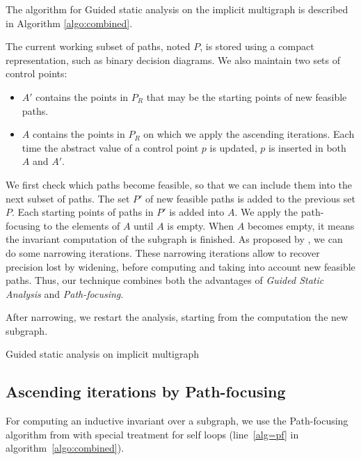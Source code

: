\documentclass[preprint]{sigplanconf}
\begin{document}
The algorithm for Guided static analysis on the implicit multigraph is described
in Algorithm \ref{algo:combined}.

The current working subset of paths, noted $P$, is stored using a
compact representation, such as binary decision diagrams.
We also maintain two sets of control points:
\begin{itemize}
	\item $A'$ contains the points in $P_R$ that may be the starting points of new
		feasible paths.
	\item $A$ contains the points in $P_R$ on which we apply the ascending iterations.
	Each time the abstract value of a control point $p$ is updated, $p$ is
	inserted in both $A$ and $A'$.
\end{itemize}

We first check which paths become feasible, so that we can include them into the
next subset of paths. The set $P'$ of new feasible paths is added to the
previous set $P$. Each starting points of paths in $P'$ is added into $A$.
We apply the path-focusing \cite{Monniaux_Gonnord_SAS11} to
the elements of $A$ until $A$ is empty. 
When $A$ becomes empty, it means the
invariant computation of the subgraph is finished. As proposed by
\citet{DBLP:conf/sas/GopanR07}, we can do some narrowing iterations.
These narrowing iterations allow to recover precision lost by
widening, before computing and taking into account new feasible paths.
Thus, our technique combines both the advantages of \emph{Guided Static
Analysis} and \emph{Path-focusing}.

After narrowing, we restart the analysis, starting from the computation the new
subgraph.

\begin{algorithm}
	\caption{Guided static analysis on implicit multigraph}
	\label{algo:combined}
	\begin{algorithmic}[1] 
	
	\end{algorithmic}
\end{algorithm}


\subsection{Ascending iterations by Path-focusing}
\label{subsec:ascending}

For computing an inductive invariant over a subgraph, we use the
Path-focusing algorithm from \citet{Monniaux_Gonnord_SAS11} with special
treatment for self loops (line~\ref{alg=pf} in algorithm~\ref{algo:combined}).
\end{document}
